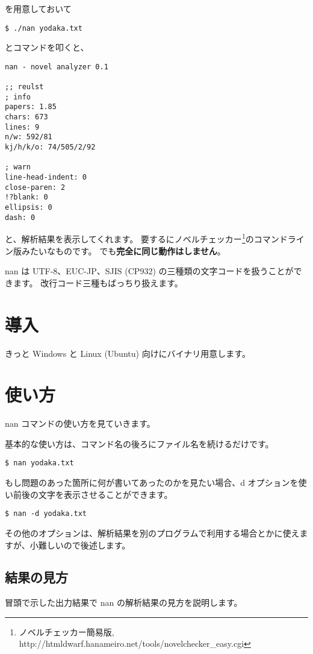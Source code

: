 \documentclass[a4j]{jsarticle}
\begin{document}
を用意しておいて

\begin{lstlisting}
$ ./nan yodaka.txt
\end{lstlisting}

とコマンドを叩くと、

\begin{lstlisting}[caption=出力]
nan - novel analyzer 0.1

;; reulst
; info
papers: 1.85
chars: 673
lines: 9
n/w: 592/81
kj/h/k/o: 74/505/2/92

; warn
line-head-indent: 0
close-paren: 2
!?blank: 0
ellipsis: 0
dash: 0
\end{lstlisting}

と、解析結果を表示してくれます。
要するにノベルチェッカー\footnote{ノベルチェッカー簡易版, http://htmldwarf.hanameiro.net/tools/novelchecker\_easy.cgi}のコマンドライン版みたいなものです。
でも\textbf{完全に同じ動作はしません}。

nan は UTF-8、EUC-JP、SJIS (CP932) の三種類の文字コードを扱うことができます。
改行コード三種もばっちり扱えます。


\section{導入}
きっと Windows と Linux (Ubuntu) 向けにバイナリ用意します。


\section{使い方}
nan コマンドの使い方を見ていきます。

基本的な使い方は、コマンド名の後ろにファイル名を続けるだけです。

\begin{lstlisting}[caption=コマンドの使い方1]
$ nan yodaka.txt
\end{lstlisting}

もし問題のあった箇所に何が書いてあったのかを見たい場合、d オプションを使い前後の文字を表示させることができます。

\begin{lstlisting}[caption=コマンドの使い方2]
$ nan -d yodaka.txt
\end{lstlisting}

その他のオプションは、解析結果を別のプログラムで利用する場合とかに使えますが、小難しいので後述します。


\subsection{結果の見方}
冒頭で示した出力結果で nan の解析結果の見方を説明します。
\end{document}
